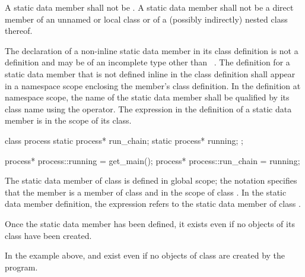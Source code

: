 \pnum
A static data member shall not be .
A static data member shall not be a direct member
of an unnamed or local class or
of a (possibly indirectly) nested class thereof.

\pnum
{}%
%
The declaration of a non-inline
static data member in its class definition
is not a definition and may be of an incomplete type other than
\cv{}~. The definition for a static data
member that is not defined inline in the class definition
shall appear in a namespace scope enclosing the member's class
definition.
%
In the definition at namespace scope, the name of the static
data member shall be qualified by its class name using the \tcode{::}
operator. The  expression in the definition of a
static data member is in the scope of its
class.
\begin{example}
\begin{codeblock}
class process {
  static process* run_chain;
  static process* running;
};

process* process::running = get_main();
process* process::run_chain = running;
\end{codeblock}

The static data member  of class
 is defined in global scope; the notation
 specifies that the member 
is a member of class  and in the scope of class
. In the static data member definition, the
 expression refers to the static data
member  of class .
\end{example}

\begin{note}
Once the static data member has been defined, it exists even if
no objects of its class have been created.
\begin{example}
In the example above,  and  exist even
if no objects of class  are created by the program.
\end{example}
\end{note}


